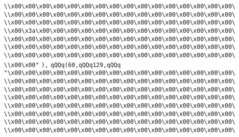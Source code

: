 \verb|\\x00\x00\x00\x00\x00\x00\x00\x00\x00\x00\x00\x00\x00\x00\x00\x00\|\newline
\verb|\\x00\x00\x00\x00\x00\x00\x00\x00\x00\x00\x00\x00\x00\x00\x00\x00\|\newline
\verb|\\x00\x00\x00\x00\x00\x00\x00\x00\x00\x00\x00\x00\x00\x00\x00\x00\|\newline
\verb|\\x00\x3a\x00\x00\x00\x00\x00\x00\x00\x00\x00\x00\x00\x00\x00\x00\|\newline
\verb|\\x00\x00\x00\x00\x00\x00\x00\x00\x00\x00\x00\x00\x00\x00\x00\x00\|\newline
\verb|\\x00\x00\x00\x00\x00\x00\x00\x00\x00\x00\x00\x00\x00\x00\x00\x00\|\newline
\verb|\\x00\x00\x00\x00\x00\x00\x00\x00\x00\x00\x00\x00\x00\x00\x00\x00\|\newline
\verb|\\x00\x00"|\newline
\verb|),|\newline
\verb|qQQq(60,qQQq129,qQQq|\newline
\verb|"\x00\x00\x00\x00\x00\x00\x00\x00\x00\x00\x00\x00\x00\x00\x00\x00\|\newline
\verb|\\x00\x00\x00\x00\x00\x00\x00\x00\x00\x00\x00\x00\x00\x00\x00\x00\|\newline
\verb|\\x00\x00\x00\x00\x00\x00\x00\x00\x00\x00\x00\x00\x00\x00\x00\x00\|\newline
\verb|\\x00\x00\x00\x00\x00\x00\x00\x00\x00\x00\x00\x00\x00\x00\x00\x00\|\newline
\verb|\\x00\x00\x00\x00\x00\x00\x00\x00\x00\x00\x00\x00\x00\x00\x00\x00\|\newline
\verb|\\x00\x00\x00\x00\x00\x00\x00\x00\x00\x00\x00\x00\x00\x00\x00\x00\|\newline
\verb|\\x00\x00\x00\x00\x00\x00\x00\x00\x00\x00\x00\x00\x00\x00\x00\x00\|\newline
\verb|\\x00\x00\x00\x00\x00\x00\x00\x00\x00\x00\x00\x00\x00\x00\x00\x00\|\newline
